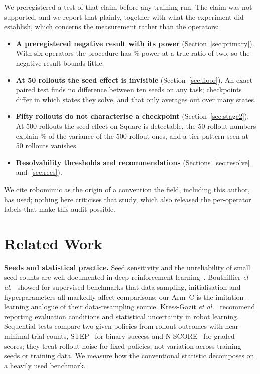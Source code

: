 \IfFileExists{IEEEtran.cls}{\documentclass[journal]{IEEEtran}}{\documentclass[10pt,twocolumn]{article}}
\begin{document}
We preregistered a test of that claim before any training run. The claim was not supported, and we report that plainly, together with what the experiment did establish, which concerns the measurement rather than the operators:
\begin{itemize}
\item \textbf{A preregistered negative result with its power} (Section~\ref{sec:primary}). With six operators the procedure has \OneSqPowTwo\% power at a true ratio of two, so the negative result bounds little.
\item \textbf{At 50 rollouts the seed effect is invisible} (Section~\ref{sec:floor}). An exact paired test finds no difference between ten seeds on any task; checkpoints differ in which states they solve, and that only averages out over many states.
\item \textbf{Fifty rollouts do not characterise a checkpoint} (Section~\ref{sec:stage2}). At 500 rollouts the seed effect on Square is detectable, the 50-rollout numbers explain \AgreeRsq\% of the variance of the 500-rollout ones, and a tier pattern seen at 50 rollouts vanishes.
\item \textbf{Resolvability thresholds and recommendations} (Sections~\ref{sec:resolve} and~\ref{sec:recs}).
\end{itemize}
We cite robomimic as the origin of a convention the field, including this author, has used; nothing here criticises that study, which also released the per-operator labels that make this audit possible.

\section{Related Work}
\textbf{Seeds and statistical practice.} Seed sensitivity and the unreliability of small seed counts are well documented in deep reinforcement learning~\cite{henderson2018matters,colas2018seeds,agarwal2021precipice}. Bouthillier \emph{et al.}~\cite{bouthillier2021variance} showed for supervised benchmarks that data sampling, initialisation and hyperparameters all markedly affect comparisons; our Arm~C is the imitation-learning analogue of their data-resampling source. Kress-Gazit \emph{et al.}~\cite{kressgazit2024empirical} recommend reporting evaluation conditions and statistical uncertainty in robot learning. Sequential tests compare two given policies from rollout outcomes with near-minimal trial counts, STEP~\cite{snyder2025step} for binary success and N-SCORE~\cite{snyder2026nscore} for graded scores; they treat rollout noise for fixed policies, not variation across training seeds or training data. We measure how the conventional statistic decomposes on a heavily used benchmark.
\end{document}
